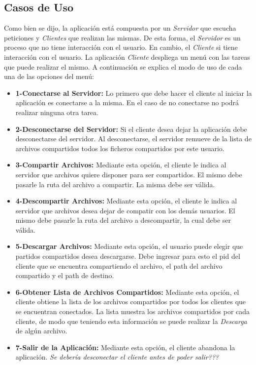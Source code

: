 \documentclass[a4paper,10pt]{article}
\begin{document}
		\subsection{Casos de Uso}

			Como bien se dijo, la aplicaci\'on est\'a compuesta por un \emph{Servidor} que escucha peticiones y \emph{Clientes} que realizan las mismas. 
			De esta forma, el \emph{Servidor} es un proceso que no tiene interacci\'on con el usuario. En cambio, el \emph{Cliente} si tiene interacci\'on
			con el usuario. La aplicaci\'on \emph{Cliente} despliega un men\'u con las tareas que puede realizar el mismo. A continuaci\'on se 
			explica el modo de uso de cada una de las opciones del men\'u: 

			\begin{itemize}
				\item \textbf{1-Conectarse al Servidor:} Lo primero que debe hacer el cliente al iniciar la aplicaci\'on es conectarse a la misma. En el caso
				de no conectarse no podr\'a realizar ninguna otra tarea.
				\item \textbf{2-Desconectarse del Servidor:} Si el cliente desea dejar la aplicaci\'on debe desconectarse del servidor. Al desconectarse, el
				servidor remueve de la lista de archivos compartidos todos los ficheros compartidos por este usuario.
				\item \textbf{3-Compartir Archivos:} Mediante esta opci\'on, el cliente le indica al servidor que archivos quiere disponer para ser compartidos.
				El mismo debe pasarle la ruta del archivo a compartir. La misma debe ser v\'alida.
				\item \textbf{4-Descompartir Archivos:} Mediante esta opci\'on, el cliente le indica al servidor que archivos desea dejar de compatir con los 
				dem\'as usuarios. El mismo debe pasarle la ruta del archivo a descompartir, la cual debe ser v\'alida.
				\item \textbf{5-Descargar Archivos:} Mediante esta opci\'on, el usuario puede elegir que partidos compartidos desea descargarse. Debe ingresar
				para esto el pid del cliente que se encuentra compartiendo el archivo, el path del archivo compartido y el path de destino.
				\item \textbf{6-Obtener Lista de Archivos Compartidos:} Mediante esta opci\'on, el cliente obtiene la lista de los archivos compartidos por 
				todos los clientes que se encuentran conectados. La lista muestra los archivos compartidos por cada cliente, de modo que teniendo esta 
				informaci\'on se puede realizar la \emph{Descarga} de alg\'un archivo.
				\item \textbf{7-Salir de la Aplicaci\'on:} Mediante esta opci\'on, el cliente abandona la aplicaci\'on. \emph{Se deber\'ia desconectar el cliente
				antes de poder salir???}
			\end{itemize}
\end{document}

